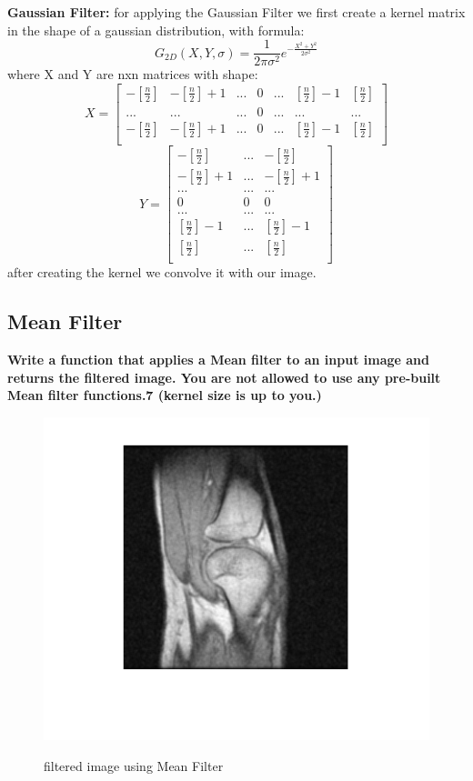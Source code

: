 \documentclass[11pt]{article}
\begin{document}
\textbf{Gaussian Filter:} for applying the Gaussian Filter we first create a kernel matrix
in the shape of a gaussian distribution, with formula:
$$G_{2D}(X,Y,\sigma) = \frac{1}{2\pi \sigma^2}e^{-\frac{X^2+Y^2}{2 \sigma^2}}$$
where X and Y are nxn matrices with shape:
$$ X = 
\begin{bmatrix}
    -\left[\frac{n}{2}\right] & -\left[\frac{n}{2}\right]+1 & ... & 0 & ... & \left[\frac{n}{2}\right]-1 & \left[\frac{n}{2}\right] \\
    ... & ... & ... & 0 & ... & ... & ...\\
    -\left[\frac{n}{2}\right] & -\left[\frac{n}{2}\right]+1 & ... & 0 & ... & \left[\frac{n}{2}\right]-1 & \left[\frac{n}{2}\right] \\
\end{bmatrix}$$
$$Y = 
\begin{bmatrix}
    -\left[\frac{n}{2}\right] &  ... & -\left[\frac{n}{2}\right]\\
    -\left[\frac{n}{2}\right]+1 &  ... & -\left[\frac{n}{2}\right]+1 \\
    ... & ... & ... \\
    0 & 0 & 0 \\
    ... & ... & ... \\
    \left[\frac{n}{2}\right]-1 &  ... & \left[\frac{n}{2}\right]-1 \\
    \left[\frac{n}{2}\right] & ... & \left[\frac{n}{2}\right] \\
\end{bmatrix}
$$
after creating the kernel we convolve it with our image.

\subsection{Mean Filter}
\textbf{Write a function that applies a Mean filter to an input image and returns the filtered image.
You are not allowed to use any pre-built Mean filter functions.7 (kernel size is up to you.)} \\

\begin{figure}[H]
    \begin{center}
        \includegraphics[scale=0.6]{Fig/mean.knee.png}
        \label{fig:MeanKnee}
        \caption{filtered image using Mean Filter}
    \end{center}
\end{figure}
\end{document}
